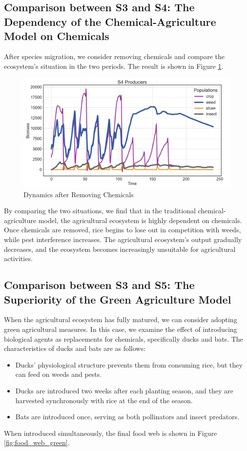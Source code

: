 \documentclass{HZNUMCM}
\begin{document}
      \subsection{Comparison between S3 and S4: The Dependency of the Chemical-Agriculture Model on Chemicals}
      After species migration, we consider removing chemicals and compare the ecosystem's situation in the two periods. 
      The result is shown in Figure \ref{fig:S4}.
      \begin{figure}
        \centering
        \includegraphics[width=0.7\linewidth]{images/P4_producers.png}
        \caption{Dynamics after Removing Chemicals}
        \label{fig:S4}
      \end{figure}
      
      By comparing the two situations, we find that in the traditional chemical-agriculture model, 
      the agricultural ecosystem is highly dependent on chemicals. Once chemicals are removed, 
      rice begins to lose out in competition with weeds, while pest interference increases. 
      The agricultural ecosystem's output gradually decreases, 
      and the ecosystem becomes increasingly unsuitable for agricultural activities.
      
      \subsection{Comparison between S3 and S5: The Superiority of the Green Agriculture Model}
        When the agricultural ecosystem has fully matured, 
        we can consider adopting green agricultural measures. In this case, 
        we examine the effect of introducing biological agents as replacements for chemicals, 
        specifically ducks and bats. The characteristics of ducks and bats are as follows:
        \begin{itemize}
            \item Ducks' physiological structure prevents them from consuming rice, but they can feed on weeds and pests.
            \item Ducks are introduced two weeks after each planting season, and they are harvested synchronously with rice at the end of the season.
            \item Bats are introduced once, serving as both pollinators and insect predators.
        \end{itemize}
          When introduced simultaneously, the final food web is shown in Figure \ref{fig:food_web_green}.
\end{document}
